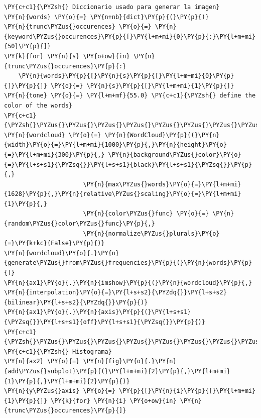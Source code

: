 \begin{tcolorbox}[breakable, size=fbox, boxrule=1pt, pad at break*=1mm,colback=cellbackground, colframe=cellborder]
\begin{Verbatim}[commandchars=\\\{\}]
\PY{c+c1}{\PYZsh{} Diccionario usado para generar la imagen}
\PY{n}{words} \PY{o}{=} \PY{n+nb}{dict}\PY{p}{(}\PY{p}{)}
\PY{n}{trunc\PYZus{}occurences} \PY{o}{=} \PY{n}{keyword\PYZus{}occurences}\PY{p}{[}\PY{l+m+mi}{0}\PY{p}{:}\PY{l+m+mi}{50}\PY{p}{]}
\PY{k}{for} \PY{n}{s} \PY{o+ow}{in} \PY{n}{trunc\PYZus{}occurences}\PY{p}{:}
    \PY{n}{words}\PY{p}{[}\PY{n}{s}\PY{p}{[}\PY{l+m+mi}{0}\PY{p}{]}\PY{p}{]} \PY{o}{=} \PY{n}{s}\PY{p}{[}\PY{l+m+mi}{1}\PY{p}{]}
\PY{n}{tone} \PY{o}{=} \PY{l+m+mf}{55.0} \PY{c+c1}{\PYZsh{} define the color of the words}
\PY{c+c1}{\PYZsh{}\PYZus{}\PYZus{}\PYZus{}\PYZus{}\PYZus{}\PYZus{}\PYZus{}\PYZus{}\PYZus{}\PYZus{}\PYZus{}\PYZus{}\PYZus{}\PYZus{}\PYZus{}\PYZus{}\PYZus{}\PYZus{}\PYZus{}\PYZus{}\PYZus{}\PYZus{}\PYZus{}\PYZus{}\PYZus{}\PYZus{}\PYZus{}\PYZus{}\PYZus{}\PYZus{}\PYZus{}\PYZus{}\PYZus{}\PYZus{}\PYZus{}\PYZus{}\PYZus{}\PYZus{}\PYZus{}\PYZus{}\PYZus{}\PYZus{}\PYZus{}\PYZus{}\PYZus{}\PYZus{}\PYZus{}\PYZus{}\PYZus{}\PYZus{}\PYZus{}\PYZus{}\PYZus{}\PYZus{}\PYZus{}\PYZus{}}
\PY{n}{wordcloud} \PY{o}{=} \PY{n}{WordCloud}\PY{p}{(}\PY{n}{width}\PY{o}{=}\PY{l+m+mi}{1000}\PY{p}{,}\PY{n}{height}\PY{o}{=}\PY{l+m+mi}{300}\PY{p}{,} \PY{n}{background\PYZus{}color}\PY{o}{=}\PY{l+s+s1}{\PYZsq{}}\PY{l+s+s1}{black}\PY{l+s+s1}{\PYZsq{}}\PY{p}{,} 
                      \PY{n}{max\PYZus{}words}\PY{o}{=}\PY{l+m+mi}{1628}\PY{p}{,}\PY{n}{relative\PYZus{}scaling}\PY{o}{=}\PY{l+m+mi}{1}\PY{p}{,}
                      \PY{n}{color\PYZus{}func} \PY{o}{=} \PY{n}{random\PYZus{}color\PYZus{}func}\PY{p}{,}
                      \PY{n}{normalize\PYZus{}plurals}\PY{o}{=}\PY{k+kc}{False}\PY{p}{)}
\PY{n}{wordcloud}\PY{o}{.}\PY{n}{generate\PYZus{}from\PYZus{}frequencies}\PY{p}{(}\PY{n}{words}\PY{p}{)}
\PY{n}{ax1}\PY{o}{.}\PY{n}{imshow}\PY{p}{(}\PY{n}{wordcloud}\PY{p}{,} \PY{n}{interpolation}\PY{o}{=}\PY{l+s+s2}{\PYZdq{}}\PY{l+s+s2}{bilinear}\PY{l+s+s2}{\PYZdq{}}\PY{p}{)}
\PY{n}{ax1}\PY{o}{.}\PY{n}{axis}\PY{p}{(}\PY{l+s+s1}{\PYZsq{}}\PY{l+s+s1}{off}\PY{l+s+s1}{\PYZsq{}}\PY{p}{)}
\PY{c+c1}{\PYZsh{}\PYZus{}\PYZus{}\PYZus{}\PYZus{}\PYZus{}\PYZus{}\PYZus{}\PYZus{}\PYZus{}\PYZus{}\PYZus{}\PYZus{}\PYZus{}\PYZus{}\PYZus{}\PYZus{}\PYZus{}\PYZus{}\PYZus{}\PYZus{}\PYZus{}\PYZus{}\PYZus{}\PYZus{}\PYZus{}\PYZus{}\PYZus{}\PYZus{}\PYZus{}\PYZus{}\PYZus{}\PYZus{}\PYZus{}\PYZus{}\PYZus{}\PYZus{}\PYZus{}\PYZus{}\PYZus{}\PYZus{}\PYZus{}\PYZus{}\PYZus{}\PYZus{}\PYZus{}}
\PY{c+c1}{\PYZsh{} Histograma}
\PY{n}{ax2} \PY{o}{=} \PY{n}{fig}\PY{o}{.}\PY{n}{add\PYZus{}subplot}\PY{p}{(}\PY{l+m+mi}{2}\PY{p}{,}\PY{l+m+mi}{1}\PY{p}{,}\PY{l+m+mi}{2}\PY{p}{)}
\PY{n}{y\PYZus{}axis} \PY{o}{=} \PY{p}{[}\PY{n}{i}\PY{p}{[}\PY{l+m+mi}{1}\PY{p}{]} \PY{k}{for} \PY{n}{i} \PY{o+ow}{in} \PY{n}{trunc\PYZus{}occurences}\PY{p}{]}

\end{Verbatim}
\end{tcolorbox}
